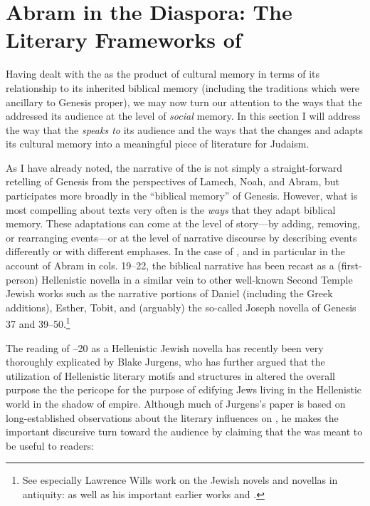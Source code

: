 
\section{Abram in the Diaspora: The Literary Frameworks of \GA}

Having dealt with the \ga as the product of cultural memory in terms of its relationship to its inherited biblical memory (including the traditions which were ancillary to Genesis proper), we may now turn our attention to the ways that the \ga addressed its audience at the level of \emph{social} memory. In this section I will address the way that the \ga \emph{speaks to} its audience and the ways that the \ga changes and adapts its cultural memory into a meaningful piece of literature for \secondtemple Judaism.

As I have already noted, the narrative of the \ga is not simply a straight-forward retelling of Genesis from the perspectives of Lamech, Noah, and Abram, but participates more broadly in the ``biblical memory'' of Genesis. However, what is most compelling about \rwb texts very often is the \emph{ways} that they adapt biblical memory. These adaptations can come at the level of story---by adding, removing, or rearranging events---or at the level of narrative discourse by describing events differently or with different emphases. In the case of \ga, and in particular in the account of Abram in cols. 19--22, the biblical narrative has been recast as a (first-person) Hellenistic novella in a similar vein to other well-known Second Temple Jewish works such as the narrative portions of Daniel (including the Greek additions), Esther, Tobit, and (arguably) the so-called Joseph novella of Genesis 37 and 39--50.\footnote{See especially Lawrence Wills work on the Jewish novels and novellas in antiquity: \cite*{wills2002} as well as his important earlier works \cite*{wills1995} and \cite{wills1990}.}

The reading of --20 as a Hellenistic Jewish novella has recently been very thoroughly explicated by Blake Jurgens, who has further argued that the utilization of Hellenistic literary motifs and structures in \ga altered the overall purpose the the pericope for the purpose of edifying Jews living in the Hellenistic world in the shadow of empire.\autocite{jurgens_jsj2018} Although much of Jurgens's paper is based on long-established observations about the literary influences on \ga, he makes the important discursive turn toward the audience by claiming that the \ga was meant to be useful to readers:

